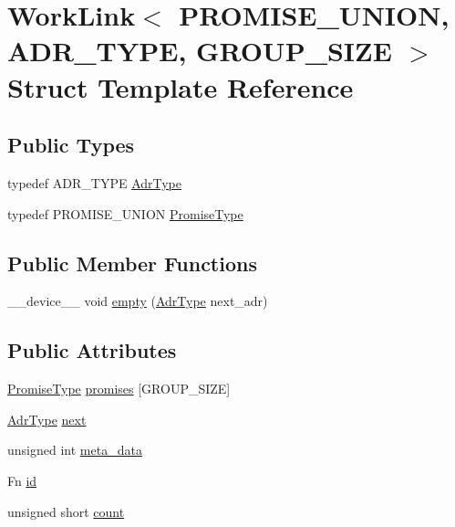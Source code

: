 \hypertarget{structWorkLink}{\section{Work\-Link$<$ P\-R\-O\-M\-I\-S\-E\-\_\-\-U\-N\-I\-O\-N, A\-D\-R\-\_\-\-T\-Y\-P\-E, G\-R\-O\-U\-P\-\_\-\-S\-I\-Z\-E $>$ Struct Template Reference}
\label{structWorkLink}
}
\subsection*{Public Types}
\begin{DoxyCompactItemize}
\item 
typedef A\-D\-R\-\_\-\-T\-Y\-P\-E \hyperlink{structWorkLink_a62a19d1e475a79a2e21b751e4ee01f5c}{Adr\-Type}
\item 
typedef P\-R\-O\-M\-I\-S\-E\-\_\-\-U\-N\-I\-O\-N \hyperlink{structWorkLink_ac1a9b55ec7f766327f5178b77fe9deeb}{Promise\-Type}
\end{DoxyCompactItemize}
\subsection*{Public Member Functions}
\begin{DoxyCompactItemize}
\item 
\-\_\-\-\_\-device\-\_\-\-\_\- void \hyperlink{structWorkLink_a362758ce6793ce3e9656a8cdd9ef2834}{empty} (\hyperlink{structWorkLink_a62a19d1e475a79a2e21b751e4ee01f5c}{Adr\-Type} next\-\_\-adr)
\end{DoxyCompactItemize}
\subsection*{Public Attributes}
\begin{DoxyCompactItemize}
\item 
\hyperlink{structWorkLink_ac1a9b55ec7f766327f5178b77fe9deeb}{Promise\-Type} \hyperlink{structWorkLink_a029f445c939f7a43774ccdab440ee5ee}{promises} \mbox{[}G\-R\-O\-U\-P\-\_\-\-S\-I\-Z\-E\mbox{]}
\item 
\hyperlink{structWorkLink_a62a19d1e475a79a2e21b751e4ee01f5c}{Adr\-Type} \hyperlink{structWorkLink_a12cf1c876e6e92a05f0eeef007d5015a}{next}
\item 
unsigned int \hyperlink{structWorkLink_ae81eecf9eb40d41538ed2127ccddc5e4}{meta\-\_\-data}
\item 
Fn \hyperlink{structWorkLink_ac697b370e9710f8c2034eb2ba02f46a5}{id}
\item 
unsigned short \hyperlink{structWorkLink_a27d203a11b0a67752aad8b698345feae}{count}
\end{DoxyCompactItemize}


